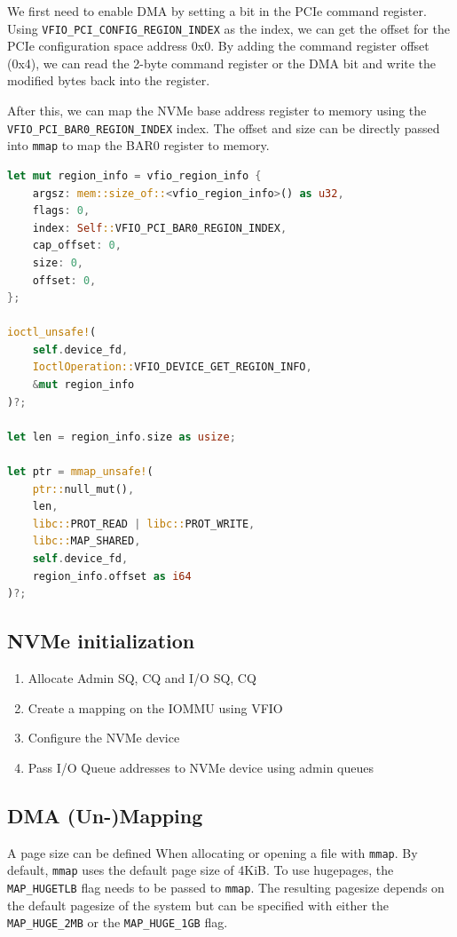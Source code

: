 We first need to enable DMA by setting a bit in the PCIe command register.
Using \texttt{VFIO\_PCI\_CONFIG\_REGION\_INDEX} as the index, we can get the offset for the PCIe configuration space address 0x0. By adding the command register offset (0x4), we can read the 2-byte command register or the DMA bit and write the modified bytes back into the register.

After this, we can map the NVMe base address register to memory using the \texttt{VFIO\_PCI\_BAR0\_REGION\_INDEX} index.
The offset and size can be directly passed into \texttt{mmap} to map the BAR0 register to memory.

\begin{minipage}{.95\linewidth}
    \begin{lstlisting}[language=Rust,caption={Mapping the BAR0 NVMe register to memory}, label=lst:bar0map]
let mut region_info = vfio_region_info {
    argsz: mem::size_of::<vfio_region_info>() as u32,
    flags: 0,
    index: Self::VFIO_PCI_BAR0_REGION_INDEX,
    cap_offset: 0,
    size: 0,
    offset: 0,
};

ioctl_unsafe!(
    self.device_fd,
    IoctlOperation::VFIO_DEVICE_GET_REGION_INFO,
    &mut region_info
)?;

let len = region_info.size as usize;

let ptr = mmap_unsafe!(
    ptr::null_mut(),
    len,
    libc::PROT_READ | libc::PROT_WRITE,
    libc::MAP_SHARED,
    self.device_fd,
    region_info.offset as i64
)?; 
\end{lstlisting}
\end{minipage}

\subsection{NVMe initialization}\label{sec:nvmeinit}


\begin{enumerate}
    \item Allocate Admin SQ, CQ and I/O SQ, CQ
    \item Create a mapping on the IOMMU using VFIO
    \item Configure the NVMe device
    \item Pass I/O Queue addresses to NVMe device using admin queues
\end{enumerate}

\subsection{DMA (Un-)Mapping}\label{sec:dmamapping}
A page size can be defined When allocating or opening a file with \texttt{mmap}. By default, \texttt{mmap} uses the default page size of 4KiB. To use hugepages, the \texttt{MAP\_HUGETLB} flag needs to be passed to \texttt{mmap}. The resulting pagesize depends on the default pagesize of the system but can be specified with either the \texttt{MAP\_HUGE\_2MB} or the \texttt{MAP\_HUGE\_1GB} flag.

